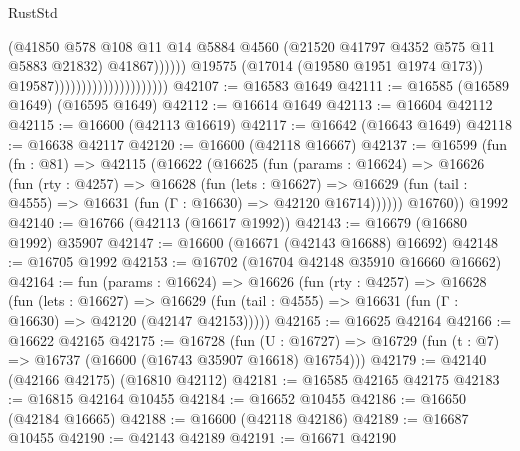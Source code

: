 \begin{lexlean}{RustStd}
\begin{coremodule}
                                                        (@41850
                                                          @578
                                                          @108
                                                          @11
                                                          @14
                                                          @5884
                                                          @4560
                                                          (@21520
                                                            @41797
                                                            @4352
                                                            @575
                                                            @11
                                                            @5883
                                                            @21832)
                                                          @41867))))))
                                              @19575
                                              (@17014 (@19580 @1951 @1974 @173))
                                              @19587)))))))))))))))))))))
@42107 := @16583 @1649
@42111 := @16585 (@16589 @1649) (@16595 @1649)
@42112 := @16614 @1649
@42113 := @16604 @42112
@42115 := @16600 (@42113 @16619)
@42117 := @16642 (@16643 @1649)
@42118 := @16638 @42117
@42120 := @16600 (@42118 @16667)
@42137 := @16599
    (fun (fn : @81) =>
    @42115
      (@16622
        (@16625
          (fun (params : @16624) =>
          @16626
            (fun (rty : @4257) =>
            @16628
              (fun (lets : @16627) =>
              @16629 (fun (tail : @4555) => @16631 (fun (Γ : @16630) => @42120 @16714))))))
        @16760))
    @1992
@42140 := @16766 (@42113 (@16617 @1992))
@42143 := @16679 (@16680 @1992) @35907
@42147 := @16600 (@16671 (@42143 @16688) @16692)
@42148 := @16705 @1992
@42153 := @16702 (@16704 @42148 @35910 @16660 @16662)
@42164 := fun (params : @16624) =>
  @16626
    (fun (rty : @4257) =>
    @16628
      (fun (lets : @16627) =>
      @16629 (fun (tail : @4555) => @16631 (fun (Γ : @16630) => @42120 (@42147 @42153)))))
@42165 := @16625 @42164
@42166 := @16622 @42165
@42175 := @16728
    (fun (U : @16727) => @16729 (fun (t : @7) => @16737 (@16600 (@16743 @35907 @16618) @16754)))
@42179 := @42140 (@42166 @42175) (@16810 @42112)
@42181 := @16585 @42165 @42175
@42183 := @16815 @42164 @10455
@42184 := @16652 @10455
@42186 := @16650 (@42184 @16665)
@42188 := @16600 (@42118 @42186)
@42189 := @16687 @10455
@42190 := @42143 @42189
@42191 := @16671 @42190

\end{coremodule}
\end{lexlean}
